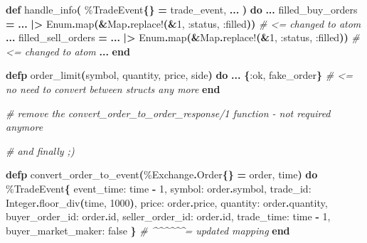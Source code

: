 \documentclass[
  oneside]{book}
\newenvironment{Shaded}{\begin{snugshade}}{\end{snugshade}}
\newcommand{\CommentTok}[1]{\textcolor[rgb]{0.56,0.35,0.01}{\textit{#1}}}
\newcommand{\ConstantTok}[1]{\textcolor[rgb]{0.56,0.35,0.01}{#1}}
\newcommand{\DecValTok}[1]{\textcolor[rgb]{0.00,0.00,0.81}{#1}}
\newcommand{\FunctionTok}[1]{\textcolor[rgb]{0.13,0.29,0.53}{\textbf{#1}}}
\newcommand{\KeywordTok}[1]{\textcolor[rgb]{0.13,0.29,0.53}{\textbf{#1}}}
\newcommand{\NormalTok}[1]{#1}
\newcommand{\OperatorTok}[1]{\textcolor[rgb]{0.81,0.36,0.00}{\textbf{#1}}}
\newcommand{\VariableTok}[1]{\textcolor[rgb]{0.00,0.00,0.00}{#1}}
\begin{document}
\begin{Shaded}
\begin{Highlighting}[]
  \KeywordTok{def}\NormalTok{ handle\_info}\FunctionTok{(}
\NormalTok{      \%}\ConstantTok{TradeEvent}\FunctionTok{\{\}} \OperatorTok{=}\NormalTok{ trade\_event,}
      \OperatorTok{...}
  \FunctionTok{)} \KeywordTok{do}
  \OperatorTok{...}
\NormalTok{    filled\_buy\_orders }\OperatorTok{=}
      \OperatorTok{...}
      \OperatorTok{|\textgreater{}} \ConstantTok{Enum}\OperatorTok{.}\NormalTok{map}\FunctionTok{(}\OperatorTok{\&}\ConstantTok{Map}\OperatorTok{.}\NormalTok{replace!}\FunctionTok{(}\OperatorTok{\&}\DecValTok{1}\NormalTok{, }\VariableTok{:status}\NormalTok{, }\VariableTok{:filled}\FunctionTok{))} \CommentTok{\# \textless{}= changed to atom}
  \OperatorTok{...}
\NormalTok{    filled\_sell\_orders }\OperatorTok{=}
      \OperatorTok{...}
      \OperatorTok{|\textgreater{}} \ConstantTok{Enum}\OperatorTok{.}\NormalTok{map}\FunctionTok{(}\OperatorTok{\&}\ConstantTok{Map}\OperatorTok{.}\NormalTok{replace!}\FunctionTok{(}\OperatorTok{\&}\DecValTok{1}\NormalTok{, }\VariableTok{:status}\NormalTok{, }\VariableTok{:filled}\FunctionTok{))} \CommentTok{\# \textless{}= changed to atom}
  \OperatorTok{...}
  \KeywordTok{end}

  \KeywordTok{defp}\NormalTok{ order\_limit}\FunctionTok{(}\NormalTok{symbol, quantity, price, side}\FunctionTok{)} \KeywordTok{do}
    \OperatorTok{...}
   \FunctionTok{\{}\VariableTok{:ok}\NormalTok{, fake\_order}\FunctionTok{\}} \CommentTok{\# \textless{}= no need to convert between structs any more}
  \KeywordTok{end}

  \CommentTok{\# remove the \textasciigrave{}convert\_order\_to\_order\_response/1\textasciigrave{} function {-} not required anymore}

  \CommentTok{\# and finally ;)}

  \KeywordTok{defp}\NormalTok{ convert\_order\_to\_event}\FunctionTok{(}\NormalTok{\%}\ConstantTok{Exchange}\OperatorTok{.}\ConstantTok{Order}\FunctionTok{\{\}} \OperatorTok{=}\NormalTok{ order, time}\FunctionTok{)} \KeywordTok{do}
\NormalTok{    \%}\ConstantTok{TradeEvent}\FunctionTok{\{}
      \VariableTok{event\_time:}\NormalTok{ time }\OperatorTok{{-}} \DecValTok{1}\NormalTok{,}
      \VariableTok{symbol:}\NormalTok{ order}\OperatorTok{.}\NormalTok{symbol,}
      \VariableTok{trade\_id:} \ConstantTok{Integer}\OperatorTok{.}\NormalTok{floor\_div}\FunctionTok{(}\NormalTok{time, }\DecValTok{1000}\FunctionTok{)}\NormalTok{,}
      \VariableTok{price:}\NormalTok{ order}\OperatorTok{.}\NormalTok{price,}
      \VariableTok{quantity:}\NormalTok{ order}\OperatorTok{.}\NormalTok{quantity,  }
      \VariableTok{buyer\_order\_id:}\NormalTok{ order}\OperatorTok{.}\NormalTok{id,}
      \VariableTok{seller\_order\_id:}\NormalTok{ order}\OperatorTok{.}\NormalTok{id,}
      \VariableTok{trade\_time:}\NormalTok{ time }\OperatorTok{{-}} \DecValTok{1}\NormalTok{,}
      \VariableTok{buyer\_market\_maker:} \ConstantTok{false}
    \FunctionTok{\}} \CommentTok{\# \^{}\^{}\^{}\^{}\^{}\^{}= updated mapping}
  \KeywordTok{end}
\end{Highlighting}
\end{Shaded}
\end{document}
